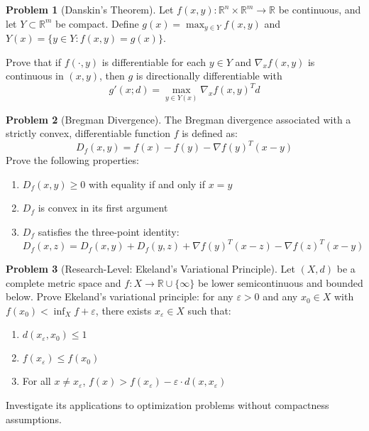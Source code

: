 \documentclass[12pt,a4paper]{article}
\theoremstyle{definition}
\newtheorem{problem}{Problem}[section]
\begin{document}
\begin{problem}[Danskin's Theorem]
Let $f(x, y): \mathbb{R}^n \times \mathbb{R}^m \to \mathbb{R}$ be continuous, and let $Y \subset \mathbb{R}^m$ be compact. Define $g(x) = \max_{y \in Y} f(x, y)$ and $Y(x) = \{y \in Y : f(x, y) = g(x)\}$.

Prove that if $f(\cdot, y)$ is differentiable for each $y \in Y$ and $\nabla_x f(x, y)$ is continuous in $(x, y)$, then $g$ is directionally differentiable with
\[g'(x; d) = \max_{y \in Y(x)} \nabla_x f(x, y)^T d\]
\end{problem}

\begin{problem}[Bregman Divergence]
The Bregman divergence associated with a strictly convex, differentiable function $f$ is defined as:
\[D_f(x, y) = f(x) - f(y) - \nabla f(y)^T(x - y)\]
Prove the following properties:
\begin{enumerate}[label=(\alph*)]
\item $D_f(x, y) \geq 0$ with equality if and only if $x = y$
\item $D_f$ is convex in its first argument
\item $D_f$ satisfies the three-point identity: $D_f(x, z) = D_f(x, y) + D_f(y, z) + \nabla f(y)^T(x - z) - \nabla f(z)^T(x - y)$
\end{enumerate}
\end{problem}

\begin{problem}[Research-Level: Ekeland's Variational Principle]
Let $(X, d)$ be a complete metric space and $f: X \to \mathbb{R} \cup \{\infty\}$ be lower semicontinuous and bounded below. Prove Ekeland's variational principle: for any $\varepsilon > 0$ and any $x_0 \in X$ with $f(x_0) < \inf_X f + \varepsilon$, there exists $x_\varepsilon \in X$ such that:
\begin{enumerate}[label=(\roman*)]
\item $d(x_\varepsilon, x_0) \leq 1$
\item $f(x_\varepsilon) \leq f(x_0)$
\item For all $x \neq x_\varepsilon$, $f(x) > f(x_\varepsilon) - \varepsilon \cdot d(x, x_\varepsilon)$
\end{enumerate}
Investigate its applications to optimization problems without compactness assumptions.
\end{problem}
\end{document}
